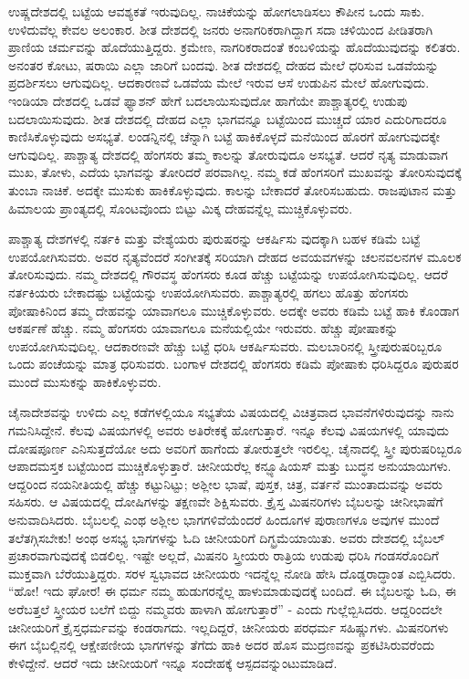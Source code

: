 ಉಷ್ಣದೇಶದಲ್ಲಿ ಬಟ್ಟೆಯ ಆವಶ್ಯಕತೆ ಇರುವುದಿಲ್ಲ. ನಾಚಿಕೆಯನ್ನು ಹೋಗಲಾಡಿಸಲು ಕೌಪೀನ ಒಂದು ಸಾಕು. ಉಳಿದುವೆಲ್ಲ ಕೇವಲ ಅಲಂಕಾರ. ಶೀತ ದೇಶದಲ್ಲಿ ಜನರು ಅನಾಗರಿಕರಾಗಿದ್ದಾಗ ಸದಾ ಚಳಿಯಿಂದ ಪೀಡಿತರಾಗಿ ಪ್ರಾಣಿಯ ಚರ್ಮವನ್ನು ಹೊದೆಯು\break ತ್ತಿದ್ದರು. ಕ್ರಮೇಣ, ನಾಗರಿಕರಾದಂತೆ ಕಂಬಳಿಯನ್ನು ಹೊದೆಯುವುದನ್ನು ಕಲಿತರು. ಅನಂತರ ಕೋಟು, ಷರಾಯಿ ಎಲ್ಲಾ ಜಾರಿಗೆ ಬಂದವು. ಶೀತ ದೇಶದಲ್ಲಿ ದೇಹದ ಮೇಲೆ ಧರಿಸುವ ಒಡವೆಯನ್ನು ಪ್ರದರ್ಶಿಸಲು ಆಗುವುದಿಲ್ಲ. ಆದಕಾರಣವೆ ಒಡವೆಯ ಮೇಲೆ ಇರುವ ಆಸೆ ಉಡುಪಿನ ಮೇಲೆ ಹೋಗುವುದು. ಇಂಡಿಯಾ ದೇಶದಲ್ಲಿ ಒಡವೆ ಫ್ಯಾಶನ್​ ಹೇಗೆ ಬದಲಾಯಿಸುವುದೋ ಹಾಗೆಯೇ ಪಾಶ್ಚಾತ್ಯರಲ್ಲಿ ಉಡುಪು ಬದಲಾಯಿಸುವುದು. ಶೀತ ದೇಶದಲ್ಲಿ ದೇಹದ ಎಲ್ಲಾ ಭಾಗವನ್ನೂ ಬಟ್ಟೆಯಿಂದ ಮುಚ್ಚದೆ ಯಾರ ಎದುರಿಗಾದರೂ ಕಾಣಿಸಿಕೊಳ್ಳುವುದು ಅಸಭ್ಯತೆ. ಲಂಡನ್ನಿನಲ್ಲಿ ಚೆನ್ನಾಗಿ ಬಟ್ಟೆ ಹಾಕಿಕೊಳ್ಳದೆ ಮನೆಯಿಂದ ಹೊರಗೆ ಹೋಗುವುದಕ್ಕೇ ಆಗುವುದಿಲ್ಲ. ಪಾಶ್ಚಾತ್ಯ ದೇಶದಲ್ಲಿ ಹೆಂಗಸರು ತಮ್ಮ ಕಾಲನ್ನು ತೋರು\break ವುದೂ ಅಸಭ್ಯತೆ. ಆದರೆ ನೃತ್ಯ ಮಾಡುವಾಗ ಮುಖ, ತೋಳು, ಎದೆಯ ಭಾಗವನ್ನು ತೋರಿದರೆ ಪರವಾಗಿಲ್ಲ. ನಮ್ಮ ಕಡೆ ಹೆಂಗಸರಿಗೆ ಮುಖವನ್ನು ತೋರಿಸುವುದಕ್ಕೆ ತುಂಬಾ ನಾಚಿಕೆ. ಅದಕ್ಕೇ ಮುಸುಕು ಹಾಕಿಕೊಳ್ಳುವುದು. ಕಾಲನ್ನು ಬೇಕಾದರೆ ತೋರಿಸಬಹುದು. ರಾಜಪುಟಾನ ಮತ್ತು ಹಿಮಾಲಯ ಪ್ರಾಂತ್ಯದಲ್ಲಿ ಸೊಂಟವೊಂದು ಬಿಟ್ಟು ಮಿಕ್ಕ ದೇಹ\break ವನ್ನೆಲ್ಲ ಮುಚ್ಚಿಕೊಳ್ಳುವರು.

ಪಾಶ್ಚಾತ್ಯ ದೇಶಗಳಲ್ಲಿ ನರ್ತಕಿ ಮತ್ತು ವೇಶ್ಯೆಯರು ಪುರುಷರನ್ನು ಆಕರ್ಷಿಸು ವುದಕ್ಕಾಗಿ ಬಹಳ ಕಡಿಮೆ ಬಟ್ಟೆ ಉಪಯೋಗಿಸುವರು. ಅವರ ನೃತ್ಯವೆಂದರೆ ಸಂಗೀತಕ್ಕೆ ಸರಿಯಾಗಿ ದೇಹದ ಅವಯವಗಳನ್ನು ಚಲನವಲನಗಳ ಮೂಲಕ ತೋರಿಸುವುದು. ನಮ್ಮ ದೇಶದಲ್ಲಿ ಗೌರವಸ್ಥ ಹೆಂಗಸರು ಕೂಡ ಹೆಚ್ಚು ಬಟ್ಟೆಯನ್ನು ಉಪಯೋಗಿಸುವುದಿಲ್ಲ. ಆದರೆ ನರ್ತಕಿಯರು ಬೇಕಾದಷ್ಟು ಬಟ್ಟೆಯನ್ನು ಉಪಯೋಗಿಸುವರು. ಪಾಶ್ಚಾತ್ಯರಲ್ಲಿ ಹಗಲು ಹೊತ್ತು ಹೆಂಗಸರು ಪೋಷಾಕಿನಿಂದ ತಮ್ಮ ದೇಹವನ್ನು ಯಾವಾಗಲೂ ಮುಚ್ಚಿಕೊಳ್ಳುವರು. ಅದಕ್ಕೇ ಅವರು ಕಡಿಮೆ ಬಟ್ಟೆ ಹಾಕಿ ಕೊಂಡಾಗ ಆಕರ್ಷಣೆ ಹೆಚ್ಚು. ನಮ್ಮ ಹೆಂಗಸರು ಯಾವಾಗಲೂ ಮನೆಯಲ್ಲಿಯೇ ಇರುವರು. ಹೆಚ್ಚು ಪೋಷಾಕನ್ನು ಉಪಯೋಗಿಸುವುದಿಲ್ಲ. ಆದಕಾರಣವೇ ಹೆಚ್ಚು ಬಟ್ಟೆ ಧರಿಸಿ ಆಕರ್ಷಿಸುವರು. ಮಲಬಾರಿನಲ್ಲಿ ಸ್ತ್ರೀಪುರುಷರಿಬ್ಬರೂ ಒಂದು ಪಂಚೆಯನ್ನು ಮಾತ್ರ ಧರಿಸುವರು. ಬಂಗಾಳ ದೇಶದಲ್ಲಿ ಹೆಂಗಸರು ಕಡಿಮೆ ಪೋಷಾಕು ಧರಿಸಿದ್ದರೂ ಪುರುಷರ ಮುಂದೆ ಮುಸುಕನ್ನು ಹಾಕಿಕೊಳ್ಳುವರು.

ಚೈನಾದೇಶವನ್ನು ಉಳಿದು ಎಲ್ಲ ಕಡೆಗಳಲ್ಲಿಯೂ ಸಭ್ಯತೆಯ ವಿಷಯದಲ್ಲಿ ವಿಚಿತ್ರವಾದ ಭಾವನೆಗಳಿರುವುದನ್ನು ನಾನು ಗಮನಿಸಿದ್ದೇನೆ. ಕೆಲವು ವಿಷಯಗಳಲ್ಲಿ ಅವರು ಅತಿರೇಕಕ್ಕೆ ಹೋಗುತ್ತಾರೆ. ಇನ್ನೂ ಕೆಲವು ವಿಷಯಗಳಲ್ಲಿ ಯಾವುದು ದೋಷಪೂರ್ಣ ಎನಿಸುತ್ತದೆಯೋ ಅದು ಅವರಿಗೆ ಹಾಗೆಂದು ತೋರುತ್ತಲೇ ಇರಲಿಲ್ಲ. ಚೈನಾದಲ್ಲಿ ಸ್ತ್ರೀ ಪುರುಷರಿಬ್ಬರೂ ಆಪಾದಮಸ್ತಕ ಬಟ್ಟೆಯಿಂದ ಮುಚ್ಚಿಕೊಳ್ಳುತ್ತಾರೆ. ಚೀನೀಯರೆಲ್ಲ ಕನ್ಫ್ಯೂಷಿ\break ಯಸ್​ ಮತ್ತು ಬುದ್ಧನ ಅನುಯಾಯಿಗಳು. ಆದ್ದರಿಂದ ನಯನೀತಿಯಲ್ಲಿ ಹೆಚ್ಚು ಕಟ್ಟುನಿಟ್ಟು; ಅಶ್ಲೀಲ ಭಾಷೆ, ಪುಸ್ತಕ, ಚಿತ್ರ, ವರ್ತನೆ ಮುಂತಾದುವನ್ನು ಅವರು ಸಹಿಸರು. ಆ ವಿಷಯದಲ್ಲಿ ದೋಷಿಗಳನ್ನು ತಕ್ಷಣವೇ ಶಿಕ್ಷಿಸುವರು. ಕ್ರೈಸ್ತ ಮಿಷನರಿಗಳು ಬೈಬಲನ್ನು ಚೀನೀಭಾಷೆಗೆ ಅನುವಾದಿಸಿದರು. ಬೈಬಲಲ್ಲಿ ಎಂಥ ಅಶ್ಲೀಲ ಭಾಗಗಳಿವೆಯೆಂದರೆ ಹಿಂದೂ\break ಗಳ ಪುರಾಣಗಳೂ ಅವುಗಳ ಮುಂದೆ ತಲೆತಗ್ಗಿಸಬೇಕು! ಅಂಥ ಅಸಭ್ಯ ಭಾಗಗಳನ್ನು ಓದಿ ಚೀನೀಯರಿಗೆ ದಿಗ್ಭ್ರಮೆಯಾಯಿತು. ಅವರು ದೇಶದಲ್ಲಿ ಬೈಬಲ್​ ಪ್ರಚಾರವಾಗುವುದಕ್ಕೆ ಬಿಡಲಿಲ್ಲ. ಇಷ್ಟೇ ಅಲ್ಲದೆ, ಮಿಷನರಿ ಸ್ತ್ರೀಯರು ರಾತ್ರಿಯ ಉಡುಪು ಧರಿಸಿ ಗಂಡಸರೊಂದಿಗೆ ಮುಕ್ತವಾಗಿ ಬೆರೆಯುತ್ತಿದ್ದರು. ಸರಳ ಸ್ವಭಾವದ ಚೀನೀಯರು ಇದನ್ನೆಲ್ಲ ನೋಡಿ ಹೇಸಿ ದೊಡ್ಡರಾದ್ಧಾಂತ ಎಬ್ಬಿಸಿದರು. “ಹೋ! ಇದು ಘೋರ! ಈ ಧರ್ಮ ನಮ್ಮ ಹುಡುಗರನ್ನೆಲ್ಲ ಹಾಳುಮಾಡುವುದಕ್ಕೆ ಬಂದಿದೆ. ಈ ಬೈಬಲನ್ನು ಓದಿ, ಈ ಅರೆಬತ್ತಲೆ ಸ್ತ್ರೀಯರ ಬಲೆಗೆ ಬಿದ್ದು ನಮ್ಮವರು ಹಾಳಾಗಿ ಹೋಗುತ್ತಾರೆ” - ಎಂದು ಗುಲ್ಲೆಬ್ಬಿಸಿದರು. ಆದ್ದರಿಂದಲೇ ಚೀನೀಯರಿಗೆ ಕ್ರೈಸ್ತಧರ್ಮವನ್ನು ಕಂಡರಾಗದು. ಇಲ್ಲದಿದ್ದರೆ, ಚೀನೀಯರು ಪರಧರ್ಮ ಸಹಿಷ್ಣುಗಳು. ಮಿಷನರಿಗಳು ಈಗ ಬೈಬಲ್ಲಿನಲ್ಲಿ ಆಕ್ಷೇಪಣೀಯ ಭಾಗಗಳನ್ನು ತೆಗೆದು ಹಾಕಿ ಅದರ ಹೊಸ ಮುದ್ರಣವನ್ನು ಪ್ರಕಟಿಸಿರುವರೆಂದು ಕೇಳಿದ್ದೇನೆ. ಆದರೆ ಇದು ಚೀನೀಯರಿಗೆ ಇನ್ನೂ ಸಂದೇಹಕ್ಕೆ ಆಸ್ಪದವನ್ನುಂಟುಮಾಡಿದೆ.

